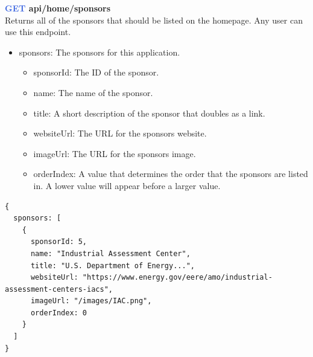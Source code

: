 \documentclass[onecolumn, draftclsnofoot,10pt, compsoc, usenames, dvipsnames]{IEEEtran}
\begin{document}
\noindent
\textbf{\textcolor{RoyalBlue}{GET} api/home/sponsors} \\
Returns all of the sponsors that should be listed on the homepage. Any user can use this endpoint.
\begin{itemize}
    \item sponsors: The sponsors for this application.
    \begin{itemize}
        \item sponsorId: The ID of the sponsor.
        \item name: The name of the sponsor.
        \item title: A short description of the sponsor that doubles as a link.
        \item websiteUrl: The URL for the sponsors website.
        \item imageUrl: The URL for the sponsors image.
        \item orderIndex: A value that determines the order that the sponsors are listed in. A lower value will appear before a larger value.
    \end{itemize}
\end{itemize}
\begin{lstlisting}[caption=Example Response]
{ 
  sponsors: [
    {
      sponsorId: 5,
      name: "Industrial Assessment Center",
      title: "U.S. Department of Energy...",
      websiteUrl: "https://www.energy.gov/eere/amo/industrial-assessment-centers-iacs",
      imageUrl: "/images/IAC.png",
      orderIndex: 0
    }
  ]
}
\end{lstlisting}
\\~\\
\end{document}

